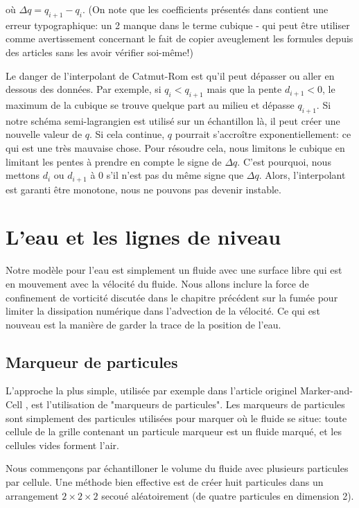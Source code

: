 \documentclass[11pt]{report}
\begin{document}
où $\Delta q = q_{i+1} - q_i$. (On note que les coefficients présentés dans \cite{fedkiw-stam-jensen-01} contient une erreur typographique: un 2 manque dans le terme cubique - qui peut être utiliser comme avertissement concernant le fait de copier aveuglement les formules depuis des articles sans les avoir vérifier soi-même!)

Le danger de l'interpolant de Catmut-Rom est qu'il peut dépasser ou aller en dessous des données. Par exemple, si $q_i < q_{i+1}$ mais que la pente $d_{i+1} < 0$, le maximum de la cubique se trouve quelque part au milieu et dépasse $q_{i+1}$. Si notre schéma semi-lagrangien est utilisé sur un échantillon là, il peut créer une nouvelle valeur de $q$. Si cela continue, $q$ pourrait s'accroître exponentiellement: ce qui est une très mauvaise chose. Pour résoudre cela, nous limitons le cubique en limitant les pentes à prendre en compte le signe de $\Delta q$. C'est pourquoi, nous mettons $d_i$ ou $d_{i+1}$ à $0$ s'il n'est pas du même signe que $\Delta q$. Alors, l'interpolant est garanti être monotone, nous ne pouvons pas devenir instable.   

\chapter{L'eau et les lignes de niveau}

Notre modèle pour l'eau est simplement un fluide avec une surface libre qui est en mouvement avec la vélocité du fluide. Nous allons inclure la force de confinement de vorticité discutée dans le chapitre précédent sur la fumée pour limiter la dissipation numérique dans l'advection de la vélocité. Ce qui est nouveau est la manière de garder la trace de la position de l'eau.

\section{Marqueur de particules} 

L'approche la plus simple, utilisée par exemple dans l'article originel Marker-and-Cell \cite{harlow-65}, est l'utilisation de "marqueurs de particules". Les marqueurs de particules sont simplement des particules utilisées pour marquer où le fluide se situe: toute cellule de la grille contenant un particule marqueur est un fluide marqué, et les cellules vides forment l'air.\newline

Nous commençons par échantilloner le volume du fluide avec plusieurs particules par cellule. Une méthode bien effective est de créer huit particules dans un arrangement $2 \times 2 \times 2$ secoué aléatoirement (de quatre particules en dimension 2).\newline
\end{document}
